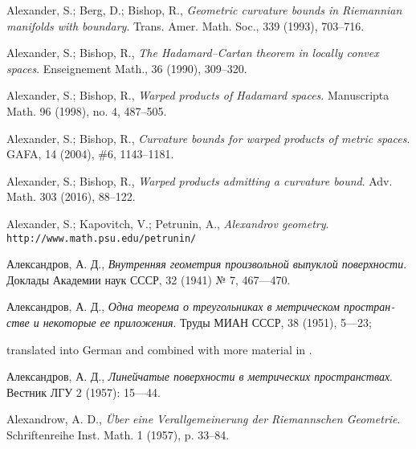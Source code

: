 \begin{thebibliography}{52}

Alexander, S.; Berg, D.; Bishop, R., 
\textit{Geometric curvature bounds in Riemannian manifolds with boundary}. 
Trans. Amer. Math. Soc., 339 (1993), 703--716.

Alexander, S.; 
Bishop, R., 
\textit{The Hadamard--Cartan theorem in locally convex spaces}. 
Enseignement Math., 
36 
(1990), 
309--320.

Alexander, S.; 
Bishop, R., 
\textit{Warped products of Hadamard spaces}.
Manuscripta Math. 96 (1998), no. 4, 487--505.


Alexander, S.; 
Bishop, R., 
\textit{Curvature bounds for warped products of metric spaces}.
GAFA,
14 (2004),
\#6, 
1143--1181.

Alexander, S.; 
Bishop, R., 
\textit{Warped products admitting a curvature bound}.
 Adv. Math. 303 (2016), 88--122.

Alexander, S.;
Kapovitch, V.;
Petrunin, A.,
\textit{Alexandrov geometry}.
 \texttt{http://www.math.psu.edu/petrunin/}
 
\begin{otherlanguage}{russian}
 Александров, А. Д.,
\textit{Внутренняя геометрия произвольной выпуклой поверхности}.
Доклады Академии наук СССР, 32 (1941) № 7, 467---470.
\end{otherlanguage}

\begin{otherlanguage}{russian}
Александров, А. Д.,
\textit{Одна теорема о треугольниках в метрическом пространстве и некоторые ее приложения}.
Труды МИАН СССР, 38 (1951), 5---23;
\end{otherlanguage}
translated into German and combined with more material in \cite{alexandrov:devel}.


\begin{otherlanguage}{russian}
Александров, А. Д., 
\textit{Линейчатые поверхности в метрических пространствах}.
Вестник ЛГУ 2 (1957): 15---44.
\end{otherlanguage}

 Alexandrow, A. D.,  \textit{\"Uber eine Verallgemeinerung der Riemannschen Geometrie}.
Schriftenreihe Inst. Math. 
1 
(1957), 
p. 33--84.


\end{thebibliography}
